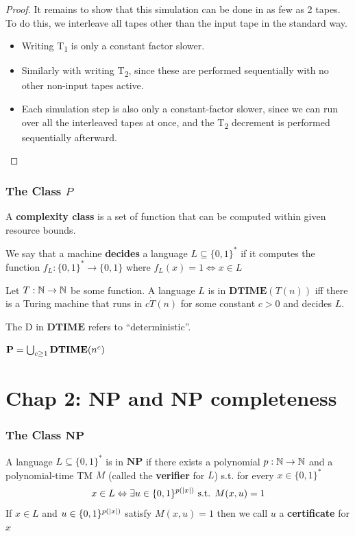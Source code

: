 \documentclass[11pt]{article}
\def \NP {\textbf{NP}}
\def \DTIME {\textbf{DTIME}}
\def \NP {\textbf{NP}}
\begin{document}
\begin{proof}
It remains to show that this simulation can be done in as few as 2 tapes. To do this, we interleave all tapes other than the input tape in the standard way.
\begin{itemize}
\item Writing T\textsubscript{1} is only a constant factor slower.
\item Similarly with writing T\textsubscript{2}, since these are performed sequentially with no other non-input tapes active.
\item Each simulation step is also only a constant-factor slower, since we can run over all the interleaved tapes at once, and the T\textsubscript{2} decrement is performed sequentially afterward.
\end{itemize}
\end{proof}


\subsubsection{The Class \texorpdfstring{\(P\)}{P}}
\label{sec:orgf712763}
A \textbf{complexity class} is a set of function that can be computed within given resource bounds.

We say that a machine \textbf{decides} a language \(L\subseteq\{0,1\}^*\) if it computes the
function \(f_L:\{0,1\}^*\to\{0,1\}\) where \(f_L(x)=1\Leftrightarrow x\in L\)

\begin{definition}[]
Let \(T:\mathbb{N}\to\mathbb{N}\) be some function. A language \(L\) is in \(\DTIME(T(n))\) iff there is a
Turing machine that runs in \(c\dot T(n)\) for some constant \(c>0\) and decides \(L\).
\end{definition}

The D in \(\DTIME\) refers to ``deterministic''.

\begin{definition}[]
\(\bP=\bigcup_{c\ge1}\DTIME(n^c)\)
\end{definition}

\section{Chap 2: NP and NP completeness}
\label{sec:orgaddc209}

\subsubsection{The Class \(\NP\)}
\label{sec:org9377e18}
\begin{definition}[]
A language \(L\subseteq\{0,1\}^*\) is in \(\NP\) if there exists  a polynomial \(p:\mathbb{N}\to\mathbb{N}\)
and a polynomial-time TM \(M\) (called the \textbf{verifier} for \(L\)) s.t. for
every \(x\in\{0,1\}^*\)
     \begin{equation*}
x\in L\Leftrightarrow \exists u\in\{0,1\}^{p(\abs{x})}\text{ s.t. }M(x,u)=1
     \end{equation*}
If \(x\in L\) and \(u\in\{0,1\}^{p(\abs{x})}\) satisfy \(M(x,u)=1\) then we call \(u\) a
\textbf{certificate} for \(x\)
\end{definition}
\end{document}
